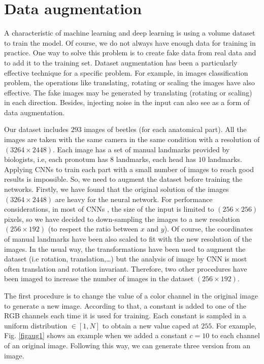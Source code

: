 \documentclass[review]{elsarticle}
\begin{document}
\section{Data augmentation}
\label{Sdataaug}
A characteristic of machine learning and deep learning is using a volume dataset to train the model. Of course, we do not always have enough data for training in practice. One way to solve this problem is to create fake data from real data and to add it to the training set. Dataset augmentation has been a particularly effective technique for a specific problem. For example, in images classification problem, the operations like translating,  rotating or scaling the images have also effective. The fake images may be generated by translating (rotating or scaling) in each direction. Besides, injecting noise in the input can also see as a form of data augmentation.

Our dataset includes $293$ images of beetles (for each anatomical part). All the images are taken with the same camera in the same condition with a resolution of $(3264 \times 2448)$. Each image has a set of manual landmarks provided by biologists, i.e, each pronotum has $8$ landmarks, each head has $10$ landmarks. Applying CNNs to train each part with a small number of images to reach good results is impossible. So, we need to augment the dataset before training the networks. Firstly, we have found that the original solution of the images $(3264 \times 2448)$ are heavy for the neural network. For performance considerations, in most of CNNs \cite{cintas2016automatic, lecun2010convolutional, sun2013deep}, the size of the input is limited to $(256 \times 256)$ pixels, so we have decided to down-sampling the images to a new resolution $(256 \times 192)$ (to respect the ratio between $x$ and $y$). Of course, the coordinates of manual landmarks have been also scaled to fit with the new resolution of the images. In the usual way, the transformations have been used to augment the dataset (i.e rotation, translation,\ldots) but the analysis of image by CNN is most often translation and rotation invariant. Therefore, two other procedures have been imaged to increase the number of images in the dataset $(256 \times 192)$.

The first procedure is to change the value of a color channel in the original image to generate a new image. According to that, a constant is added to one of the RGB channels each time it is used for training. Each constant is sampled in a uniform distribution $\in [1, N]$ to obtain a new value caped at $255$. For example, Fig. \ref{figaug1} shows an example when we added a constant $c = 10$ to each channel of an original image. Following this way, we can generate three version from an image.
\end{document}
